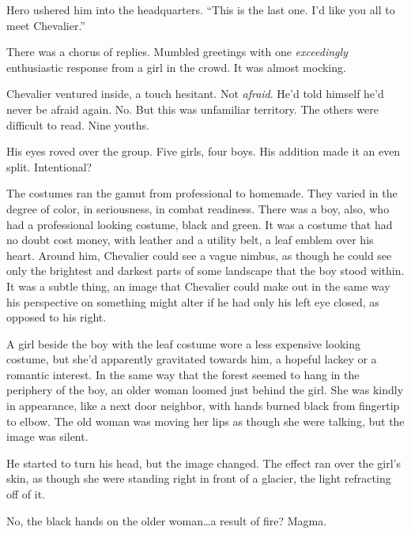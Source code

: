 





Hero ushered him into the headquarters.  ``This is the last one.  I'd like you all to meet Chevalier.''



There was a chorus of replies.  Mumbled greetings with one \emph{exceedingly }enthusiastic response from a girl in the crowd.  It was almost mocking.



Chevalier ventured inside, a touch hesitant.  Not \emph{afraid}.  He'd told himself he'd never be afraid again.  No.  But this was unfamiliar territory.  The others were difficult to read.  Nine youths.



His eyes roved over the group.  Five girls, four boys.  His addition made it an even split.  Intentional?



The costumes ran the gamut from professional to homemade.  They varied in the degree of color, in seriousness, in combat readiness.  There was a boy, also, who had a professional looking costume, black and green.  It was a costume that had no doubt cost money, with leather and a utility belt, a leaf emblem over his heart.  Around him, Chevalier could see a vague nimbus, as though he could see only the brightest and darkest parts of some landscape that the boy stood within.  It was a subtle thing, an image that Chevalier could make out in the same way his perspective on something might alter if he had only his left eye closed, as opposed to his right.



A girl beside the boy with the leaf costume wore a less expensive looking costume, but she'd apparently gravitated towards him, a hopeful lackey or a romantic interest.  In the same way that the forest seemed to hang in the periphery of the boy, an older woman loomed just behind the girl.  She was kindly in appearance, like a next door neighbor, with hands burned black from fingertip to elbow.  The old woman was moving her lips as though she were talking, but the image was silent.



He started to turn his head, but the image changed.  The effect ran over the girl's skin, as though she were standing right in front of a glacier, the light refracting off of it.



No, the black hands on the older woman\ldots a result of fire?  Magma.



